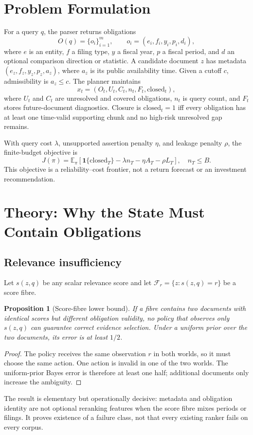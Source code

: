 \documentclass[12pt]{article}
\newtheorem{proposition}{Proposition}
\begin{document}
\section{Problem Formulation}
For a query $q$, the parser returns obligations
\[
 O(q)=\{o_i\}_{i=1}^{m},\qquad o_i=(e_i,f_i,y_i,p_i,d_i),
\]
where $e$ is an entity, $f$ a filing type, $y$ a fiscal year, $p$ a fiscal period, and $d$ an optional comparison direction or statistic. A candidate document $z$ has metadata $(e_z,f_z,y_z,p_z,a_z)$, where $a_z$ is its public availability time. Given a cutoff $c$, admissibility is $a_z\le c$. The planner maintains
\[
 x_t=(O_t,U_t,C_t,n_t,F_t,\mathrm{closed}_t),
\]
where $U_t$ and $C_t$ are unresolved and covered obligations, $n_t$ is query count, and $F_t$ stores future-document diagnostics. Closure is $\mathrm{closed}_t=1$ iff every obligation has at least one time-valid supporting chunk and no high-risk unresolved gap remains.

With query cost $\lambda$, unsupported assertion penalty $\eta$, and leakage penalty $\rho$, the finite-budget objective is
\[
 J(\pi)=\mathbb{E}_{\pi}\left[\mathbf{1}\{\mathrm{closed}_T\}-\lambda n_T-\eta A_T-\rho L_T\right],\quad n_T\le B.
\]
This objective is a reliability--cost frontier, not a return forecast or an investment recommendation.

\section{Theory: Why the State Must Contain Obligations}
\subsection{Relevance insufficiency}
Let $s(z,q)$ be any scalar relevance score and let $\mathcal{F}_r=\{z:s(z,q)=r\}$ be a score fibre.
\begin{proposition}[Score-fibre lower bound]
If a fibre contains two documents with identical scores but different obligation validity, no policy that observes only $s(z,q)$ can guarantee correct evidence selection. Under a uniform prior over the two documents, its error is at least $1/2$.
\end{proposition}
\begin{proof}
The policy receives the same observation $r$ in both worlds, so it must choose the same action. One action is invalid in one of the two worlds. The uniform-prior Bayes error is therefore at least one half; additional documents only increase the ambiguity.
\end{proof}
The result is elementary but operationally decisive: metadata and obligation identity are not optional reranking features when the score fibre mixes periods or filings. It proves existence of a failure class, not that every existing ranker fails on every corpus.
\end{document}
